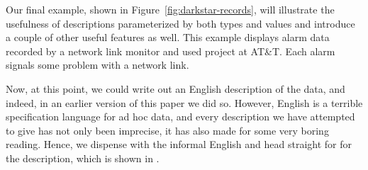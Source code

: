 Our final example, shown in
Figure~\ref{fig:darkstar-records}, will illustrate 
the usefulness of descriptions parameterized by
both types and values and introduce a couple of other
useful features as well.   This example displays
alarm data recorded by a network link monitor
and used \darkstar{} project at AT\&T.  Each alarm signals some
problem with a network link.  

Now, at this point, we could write out an English description
of the \darkstar{} data, and indeed, in an earlier version of this paper
we did so.  However, English is a terrible specification language
for ad hoc data, and every description we have attempted to give has not 
only been imprecise, it has also made for some very 
boring reading.  Hence, we dispense with the informal
English and head straight for for the \datatype{} description,
which is shown in .



